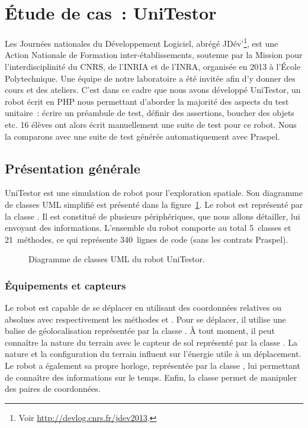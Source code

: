 \section{Étude de cas~: UniTestor}
\label{section:experimentation:unitestor}

Les Journées nationales du Développement Logiciel, abrégé JDév'\footnote{Voir
\url{http://devlog.cnrs.fr/jdev2013}.}, est une Action Nationale de Formation
inter-établissements, soutenue par la Mission pour l'interdisciplinité du CNRS,
de l'INRIA et de l'INRA, organisée en 2013 à l'École Polytechnique. Une équipe
de notre laboratoire a été invitée afin d'y donner des cours et des ateliers.
C'est dans ce cadre que nous avons développé UniTestor, un robot écrit en PHP
nous permettant d'aborder la majorité des aspects du test unitaire~: écrire un
préambule de test, définir des assertions, boucher des objets etc. 16 élèves ont
alors écrit manuellement une suite de test pour ce robot. Nous la comparons avec
une suite de test générée automatiquement avec Praspel.

\subsection{Présentation générale}

UniTestor est une simulation de robot pour l'exploration spatiale. Son diagramme
de classes UML simplifié est présenté dans la
figure~\ref{figure:experimentation:unitestor}. Le robot est représenté par la
classe . Il est constitué de plusieurs périphériques, que nous
allons détailler, lui envoyant des informations. L'ensemble du robot comporte au
total 5~classes et 21~méthodes, ce qui représente 340~lignes de code (sans les
contrats Praspel).
%
\begin{figure}


\caption{\label{figure:experimentation:unitestor} Diagramme de classes UML du
robot UniTestor.}

\end{figure}

\subsubsection{Équipements et capteurs}

Le robot est capable de se déplacer en utilisant des coordonnées relatives ou
absolues avec respectivement les méthodes  et . Pour se
déplacer, il utilise une balise de géolocalisation représentée par la classe
. À tout moment, il peut connaître la nature du terrain avec
le capteur de sol représenté par la classe . La nature et la
configuration du terrain influent sur l'énergie utile à un déplacement. Le robot
a également sa propre horloge, représentée par la classe , lui
permettant de connaître des informations sur le temps. Enfin, la classe
 permet de manipuler des paires de coordonnées.


